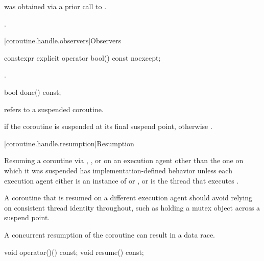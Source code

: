 \begin{itemdescr}
\pnum
\expects
{} was obtained via a prior call to .

\pnum
\ensures
{}.
\end{itemdescr}

[coroutine.handle.observers]{Observers}

%
\begin{itemdecl}
constexpr explicit operator bool() const noexcept;
\end{itemdecl}

\begin{itemdescr}
\pnum
\returns
{}.
\end{itemdescr}

%
\begin{itemdecl}
bool done() const;
\end{itemdecl}

\begin{itemdescr}
\pnum
\expects
{} refers to a suspended coroutine.

\pnum
\returns
{} if the coroutine is suspended at its
final suspend point, otherwise .
\end{itemdescr}

[coroutine.handle.resumption]{Resumption}

\pnum
Resuming a coroutine via , , or 
on an execution agent other than the one on which it was suspended
has implementation-defined behavior unless
each execution agent either is
an instance of  or ,
or is the thread that executes .
\begin{note}
A coroutine that is resumed on a different execution agent should
avoid relying on consistent thread identity throughout, such as holding
a mutex object across a suspend point.
\end{note}
\begin{note}
A concurrent resumption of the coroutine can result in a data race.
\end{note}

%
%
\begin{itemdecl}
void operator()() const;
void resume() const;
\end{itemdecl}

